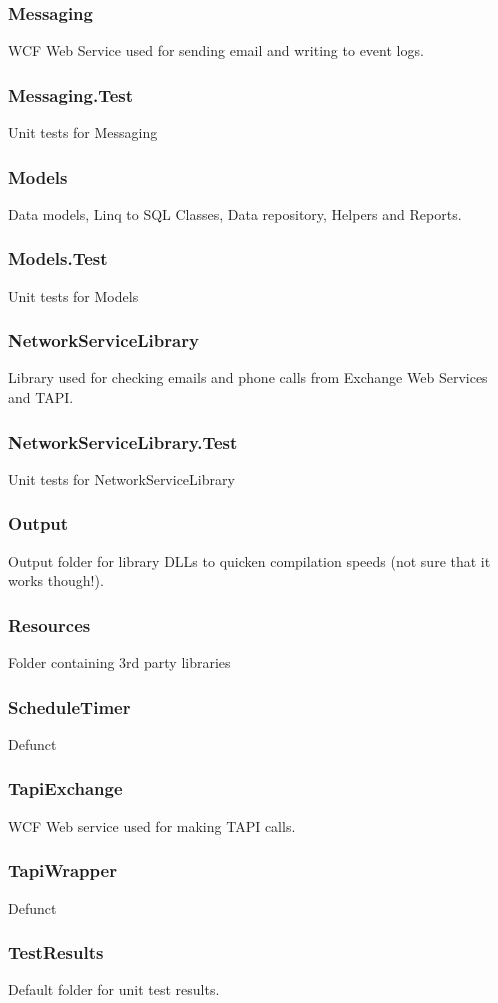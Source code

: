 \documentclass{article}
\begin{document}
\subsubsection{Messaging}
WCF Web Service used for sending email and writing to event logs.
\subsubsection{Messaging.Test}
Unit tests for Messaging
\subsubsection{Models}
Data models, Linq to SQL Classes, Data repository, Helpers and Reports.
\subsubsection{Models.Test}
Unit tests for Models
\subsubsection{NetworkServiceLibrary}
Library used for checking emails and phone calls from Exchange Web Services and TAPI.
\subsubsection{NetworkServiceLibrary.Test}
Unit tests for NetworkServiceLibrary
\subsubsection{Output}
Output folder for library DLLs to quicken compilation speeds (not sure that it works though!).
\subsubsection{Resources}
Folder containing 3rd party libraries
\subsubsection{ScheduleTimer}
Defunct
\subsubsection{TapiExchange}
WCF Web service used for making TAPI calls.
\subsubsection{TapiWrapper}
Defunct
\subsubsection{TestResults}
Default folder for unit test results.
\end{document}
